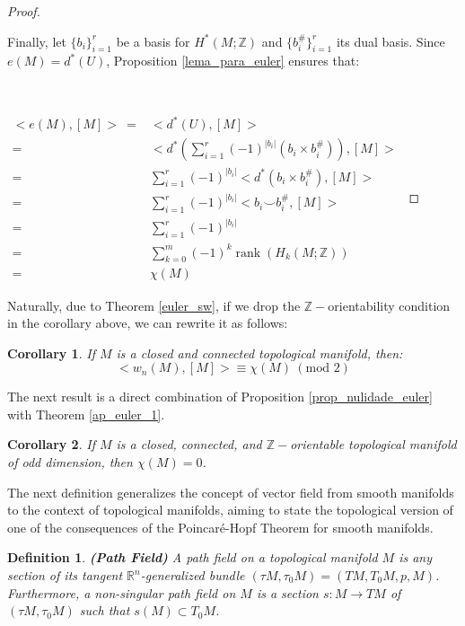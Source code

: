 \documentclass[12pt,oneside]{book}
\newtheorem{defi}   {Definition}[chapter]
\newtheorem{cor}    {Corollary}[chapter]
\newcommand{\ds}{\displaystyle}
\newcommand{\R}{\mathbb{R}}
\newcommand{\Z}{\mathbb{Z}}
\newcommand{\ccup}{\smile}
\begin{document}
\begin{proof}
        \

        Finally, let $\{b_{i}\}_{i=1}^{r}$ be a basis for $H^{*}(M;\Z)$ and $\{b_{i}^{\#}\}_{i=1}^{r}$ its dual basis. 
        Since $e(M) = d^{*}(U)$, Proposition \ref{lema_para_euler} ensures that:

        \

        $ \begin{array}{rl}
        	<e(M),[M]> \ = & <d^{*}(U),[M]> \\
        	= & <d^{*}\left( \ds\sum_{i=1}^{r} (-1)^{|b_{i}|}( b_{i} \times b_{i}^{\#} ) \right),[M]> \\
        	= & \ds\sum_{i=1}^{r}(-1)^{|b_{i}|}<d^{*}(b_{i} \times b_{i}^{\#}),[M]> \\
        	= & \ds\sum_{i=1}^{r}(-1)^{|b_{i}|}<b_{i} \ccup b_{i}^{\#},[M]> \\
        	= & \ds\sum_{i=1}^{r}(-1)^{|b_{i}|} \\
        	= & \ds\sum_{k=0}^{m}(-1)^{k} \operatorname{rank}(H_{k}(M;\Z)) \\
        	= & \chi(M)
        \end{array} $

    \end{proof}

    Naturally, due to Theorem \ref{euler_sw}, if we drop the $\Z-$orientability condition in the corollary above, we can rewrite it as follows:

    \begin{cor}\label{ap_euler_3}
    	If $M$ is a closed and connected topological manifold, then:
    	$$ <w_{n}(M),[M]>\equiv\chi(M) \ (\text{mod } 2) $$
    \end{cor}

    The next result is a direct combination of Proposition \ref{prop_nulidade_euler} with Theorem \ref{ap_euler_1}.

    \begin{cor}
    	If $M$ is a closed, connected, and $\Z-$orientable topological manifold of odd dimension, then $\chi(M)=0$.
    \end{cor}

    The next definition generalizes the concept of vector field from smooth manifolds to the 
    context of topological manifolds, aiming to state the topological version of one of the consequences of the Poincaré-Hopf 
    Theorem for smooth manifolds.

    \begin{defi}{\bf (Path Field)}
    	A \emph{path field} on a topological manifold $M$ is any section of its tangent $\R^{n}$-generalized 
        bundle $(\tau M,\tau_{0}M)=(TM,T_{0}M,p,M)$. Furthermore, a 
        \emph{non-singular path field} on $M$ is a section $s:M\to TM$ of $(\tau M,\tau_{0}M)$ 
        such that $s(M)\subset T_{0}M$.
    \end{defi}
\end{document}
